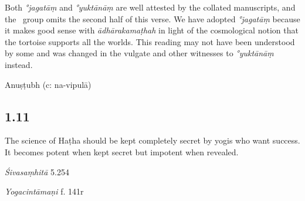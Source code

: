 \begin{ekdosis}
\begin{philcomm}[hp01_010]

Both \emph{°jagatāṃ} and \emph{°yuktānāṃ} are well attested by the collated manuscripts, and the \textalpha\ group omits the second half of this verse.
We have adopted \emph{°jagatāṃ}  because it makes good sense with  \emph{ādhārakamaṭhah} in light of the cosmological notion that the tortoise supports all the worlds. This reading may not have been understood by some and was changed in the vulgate and other witnesses to \emph{°yuktānāṃ} instead.      
\end{philcomm}

\begin{metre}[hp01_010]
Anuṣṭubh (c: na-vipulā)
\end{metre}

\subsection*{1.11}
\begin{translation}[hp01_011]
The science of Haṭha should be kept completely secret by yogis who want success. It becomes potent when kept secret but impotent when revealed.
\end{translation}

\begin{sources}[hp01_011]
\emph{Śivasaṃhitā} 5.254

\begin{versinnote}
\tl{\var{haṭhavidyā ... icchatā ] \emph{om.} III–XII, XIV}\\!}
\end{versinnote}

\end{sources}

\begin{testimonia}[hp01_011]
\emph{Yogacintāmaṇi} f. 141r %

\begin{versinnote}
\end{versinnote}


\end{testimonia}
\end{ekdosis}
